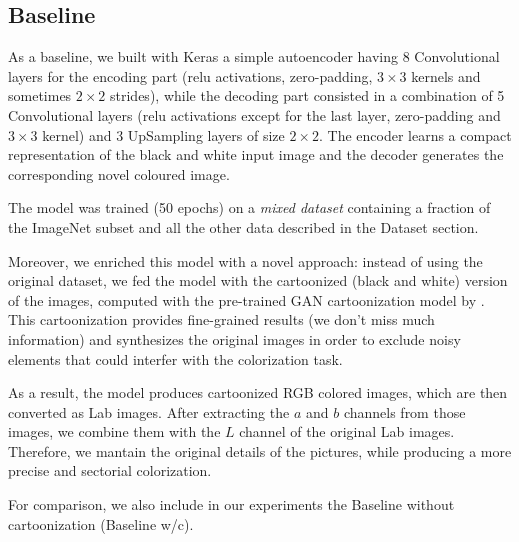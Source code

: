 \subsection{Baseline}
As a baseline, we built with Keras a simple autoencoder having 8 Convolutional layers for the encoding part (relu activations, zero-padding, $3\times3$ kernels and sometimes $2\times2$ strides), while the decoding part consisted in a combination of 5 Convolutional layers (relu activations except for the last layer, zero-padding and $3\times3$ kernel) and 3 UpSampling layers of size $2\times2$. The encoder learns a compact representation of the black and white input image and the decoder generates the corresponding novel coloured image.

The model was trained (50 epochs) on a \textit{mixed dataset} containing a fraction of the ImageNet subset and all the other data described in the Dataset section.

Moreover, we enriched this model with a novel approach: instead of using the original dataset, we fed the model with the cartoonized (black and white) version of the images, computed with the pre-trained GAN cartoonization model by \cite{cartoonize}. This cartoonization provides fine-grained results (we don't miss much information) and synthesizes the original images in order to exclude noisy elements that could interfer with the colorization task.

As a result, the model produces cartoonized RGB colored images, which are then converted as Lab images. After extracting the $a$ and $b$ channels from those images, we combine them with the $L$ channel of the original Lab images. Therefore, we mantain the original details of the pictures, while producing a more precise and sectorial colorization.

For comparison, we also include in our experiments the Baseline without cartoonization (Baseline w/c).